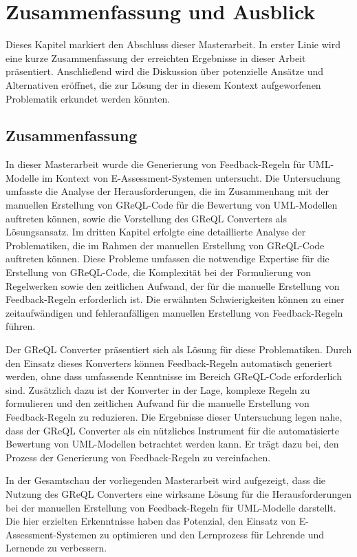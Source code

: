 \chapter{Zusammenfassung und Ausblick}

Dieses Kapitel markiert den Abschluss dieser Masterarbeit. In erster Linie wird eine kurze Zusammenfassung der
erreichten Ergebnisse in dieser Arbeit präsentiert. Anschließend wird die Diskussion über potenzielle Ansätze und
Alternativen eröffnet, die zur Lösung der in diesem Kontext aufgeworfenen Problematik erkundet werden könnten.

\section{Zusammenfassung}

In dieser Masterarbeit wurde die Generierung von Feedback-Regeln für UML-Modelle im Kontext von E-Assessment-Systemen
untersucht. Die Untersuchung umfasste die Analyse der Herausforderungen, die im Zusammenhang mit der manuellen
Erstellung von GReQL-Code für die Bewertung von UML-Modellen auftreten können, sowie die Vorstellung des GReQL
Converters als Lösungsansatz. Im dritten Kapitel erfolgte eine detaillierte Analyse der Problematiken, die im
Rahmen der manuellen Erstellung von GReQL-Code auftreten können. Diese Probleme umfassen die notwendige Expertise für
die Erstellung von GReQL-Code, die Komplexität bei der Formulierung von Regelwerken sowie den zeitlichen Aufwand,
der für die manuelle Erstellung von Feedback-Regeln erforderlich ist. Die erwähnten Schwierigkeiten können zu einer
zeitaufwändigen und fehleranfälligen  manuellen Erstellung von Feedback-Regeln führen.

Der GReQL Converter präsentiert sich als Lösung für diese Problematiken. Durch den Einsatz dieses Konverters können
Feedback-Regeln automatisch generiert werden, ohne dass umfassende Kenntnisse im Bereich GReQL-Code erforderlich sind.
Zusätzlich dazu ist der Konverter in der Lage, komplexe Regeln zu formulieren und den zeitlichen Aufwand für die
manuelle Erstellung von Feedback-Regeln zu reduzieren. Die Ergebnisse dieser Untersuchung legen nahe, dass der GReQL
Converter als ein nützliches Instrument für die automatisierte Bewertung von UML-Modellen betrachtet werden kann. Er
trägt dazu bei, den Prozess der Generierung von Feedback-Regeln zu vereinfachen.

In der Gesamtschau der vorliegenden Masterarbeit wird aufgezeigt, dass die Nutzung des GReQL Converters eine wirksame
Lösung für die Herausforderungen bei der manuellen Erstellung von Feedback-Regeln für UML-Modelle darstellt. Die hier
erzielten Erkenntnisse haben das Potenzial, den Einsatz von E-Assessment-Systemen zu optimieren und den Lernprozess für
Lehrende und Lernende zu verbessern.

